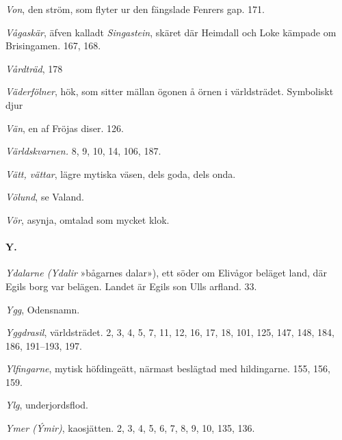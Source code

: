 \emph{Von}, den ström, som flyter ur den fängslade Fenrers gap. 171.

\emph{Vågaskär}, äfven kalladt \emph{Singastein}, skäret där Heimdall
och Loke kämpade om Brisingamen. 167, 168.

\emph{Vårdträd}, 178

\emph{Väderfölner}, hök, som sitter mällan ögonen å örnen i
världsträdet. Symboliskt djur

\emph{Vän}, en af Fröjas diser. 126.

\protect\hypertarget{lb1625905.xhtmlux5cux23start247}{}{}\protect\hypertarget{lb1625905.xhtmlux5cux23start247-a}{}{}\protect\hypertarget{lb1625905.xhtmlux5cux23start247-b}{}{}\protect\hypertarget{lb1625905.xhtmlux5cux23start247-c}{}{}\protect\hypertarget{lb1625905.xhtmlux5cux23start247-d}{}{}

\emph{Världskvarnen.} 8, 9, 10, 14, 106, 187.

\emph{Vätt, vättar}, lägre mytiska väsen, dels goda, dels onda.

\emph{Völund}, se Valand.

\emph{Vör}, asynja, omtalad som mycket klok.

\paragraph{Y.}

\emph{Ydalarne (Ydalir} »bågarnes dalar»), ett söder om Elivågor beläget
land, där Egils borg var belägen. Landet är Egils son Ulls arfland. 33.

\emph{Ygg}, Odensnamn.

\emph{Yggdrasil}, världsträdet. 2, 3, 4, 5, 7, 11, 12, 16, 17, 18, 101,
125, 147, 148, 184, 186, 191--193, 197.

\emph{Ylfingarne}, mytisk höfdingeätt, närmast beslägtad med
hildingarne. 155, 156, 159.

\emph{Ylg}, underjordsflod.

\emph{Ymer (Ýmir)}, kaosjätten. 2, 3, 4, 5, 6, 7, 8, 9, 10, 135, 136.

